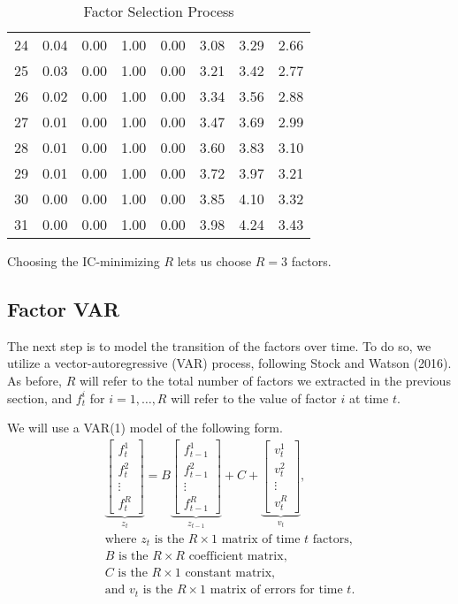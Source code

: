 \documentclass[11pt, letterpaper]{article}\usepackage[]{graphicx}\usepackage[]{color}
\begin{document}
\begin{table}[H]
\begin{tabular}{cccccccc}
   24 & 0.04 & 0.00 & 1.00 & 0.00 & 3.08 & 3.29 & 2.66 \\ 
   25 & 0.03 & 0.00 & 1.00 & 0.00 & 3.21 & 3.42 & 2.77 \\ 
   26 & 0.02 & 0.00 & 1.00 & 0.00 & 3.34 & 3.56 & 2.88 \\ 
   27 & 0.01 & 0.00 & 1.00 & 0.00 & 3.47 & 3.69 & 2.99 \\ 
   28 & 0.01 & 0.00 & 1.00 & 0.00 & 3.60 & 3.83 & 3.10 \\ 
   29 & 0.01 & 0.00 & 1.00 & 0.00 & 3.72 & 3.97 & 3.21 \\ 
   30 & 0.00 & 0.00 & 1.00 & 0.00 & 3.85 & 4.10 & 3.32 \\ 
   31 & 0.00 & 0.00 & 1.00 & 0.00 & 3.98 & 4.24 & 3.43 \\ 
   \hline
\end{tabular}
\endgroup
\caption{Factor Selection Process} 
\end{table}


Choosing the IC-minimizing $R$ lets us choose $R = 3$ factors.



\subsection{Factor VAR}
The next step is to model the transition of the factors over time. To do so, we utilize a vector-autoregressive (VAR) process, following Stock and Watson (2016). As before, $R$ will refer to the total number of factors we extracted in the previous section, and $f^i_t$ for $i = 1, \dots, R$ will refer to the value of factor $i$ at time $t$.

We will use a VAR(1) model of the following form.
\begin{align*}
\underbrace{\begin{bmatrix}
	f^1_{t}\\
	f^2_{t}\\
	\vdots \\
	f^R_{t}
\end{bmatrix}}_{z_t}
=
B
\underbrace{\begin{bmatrix}
	f^1_{t-1}\\
	f^2_{t-1}\\
	\vdots \\
	f^R_{t-1}
\end{bmatrix}}_{z_{t-1}}
+
C
+
\underbrace{\begin{bmatrix}
v^1_t\\
v^2_t\\
\vdots\\
v^R_t
\end{bmatrix}}_{v_t},\\
\text{where $z_t$ is the $R \times 1$ matrix of time $t$ factors,}\\
\text{$B$ is the $R \times R$ coefficient matrix,}\\
\text{$C$ is the $R \times 1$ constant matrix,}\\
\text{and $v_t$ is the $R \times 1$ matrix of errors for time $t$.}
\end{align*}
\end{document}

